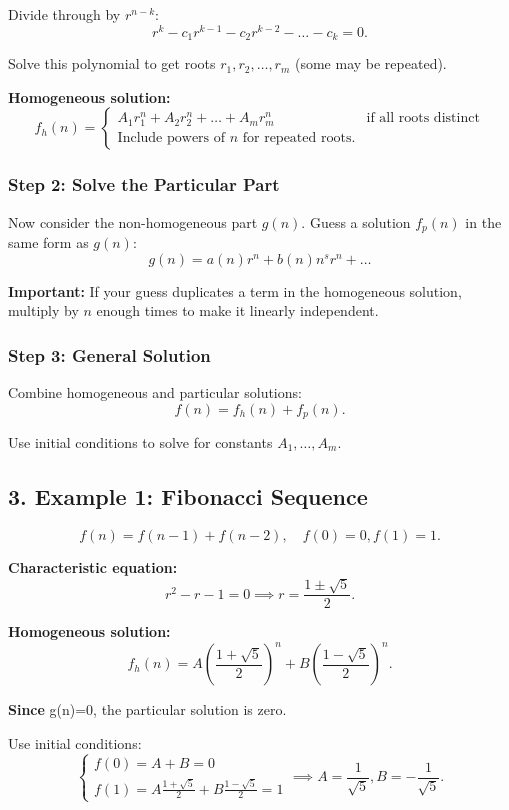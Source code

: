 \documentclass[12pt]{extarticle}
\begin{document}
Divide through by \(r^{n-k}\):
\[
r^k - c_1 r^{k-1} - c_2 r^{k-2} - \dots - c_k = 0.
\]

Solve this polynomial to get roots \(r_1, r_2, \dots, r_m\) (some may be repeated).

\textbf{Homogeneous solution:}
\[
f_h(n) =
\begin{cases}
A_1 r_1^n + A_2 r_2^n + \dots + A_m r_m^n & \text{if all roots distinct} \\
\text{Include powers of } n \text{ for repeated roots.}
\end{cases}
\]

\subsubsection*{Step 2: Solve the Particular Part}

Now consider the non-homogeneous part \(g(n)\). Guess a solution \(f_p(n)\) in the same form as \(g(n)\):
\[
g(n) = a(n) r^n + b(n) n^s r^n + \dots
\]

\textbf{Important:} If your guess duplicates a term in the homogeneous solution, multiply by \(n\) enough times to make it linearly independent.

\subsubsection*{Step 3: General Solution}

Combine homogeneous and particular solutions:
\[
f(n) = f_h(n) + f_p(n).
\]

Use initial conditions to solve for constants \(A_1, \dots, A_m\).

\subsection*{3. Example 1: Fibonacci Sequence}

\[
f(n) = f(n-1) + f(n-2), \quad f(0)=0, f(1)=1.
\]

\textbf{Characteristic equation:}
\[
r^2 - r - 1 = 0 \implies r = \frac{1\pm \sqrt{5}}{2}.
\]

\textbf{Homogeneous solution:}
\[
f_h(n) = A \left(\frac{1+\sqrt{5}}{2}\right)^n + B \left(\frac{1-\sqrt{5}}{2}\right)^n.
\]

\textbf{Since } g(n)=0, the particular solution is zero.

Use initial conditions:
\[
\begin{cases}
f(0) = A + B = 0 \\
f(1) = A \frac{1+\sqrt{5}}{2} + B \frac{1-\sqrt{5}}{2} = 1
\end{cases} \implies A = \frac{1}{\sqrt{5}}, B = -\frac{1}{\sqrt{5}}.
\]
\end{document}
